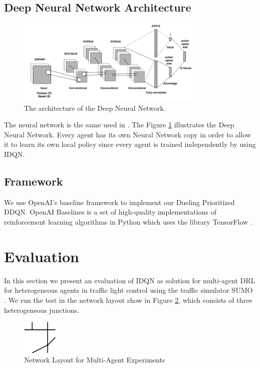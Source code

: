 \documentclass{llncs}
\begin{document}
\subsection{Deep Neural Network Architecture}\label{DNNArch}

\begin{figure}[!htbp]
\begin{center}
  \includegraphics[width=0.8\textwidth]{images/CNN.png}
  \caption{The architecture of the Deep Neural Network.}
  \label{fig:CNN}
\end{center}
\end{figure}

The neural network is the same used in \cite{Wang2016}. The Figure \ref{fig:CNN} illustrates the Deep Neural Network. Every agent has its own Neural Network copy in order to allow it to learn its own local policy since every agent is trained independently by using IDQN.

\subsection{Framework}

We use OpenAI's baseline framework \cite{baselines} to implement our Dueling Prioritized DDQN. OpenAI Baselines is a set of high-quality implementations of reinforcement learning algorithms in Python which uses the library TensorFlow \cite{Abadi2016}. 

\section{Evaluation}

In this section we present an evaluation of IDQN as solution for multi-agent DRL for heterogeneous agents in traffic light control using the traffic simulator SUMO \cite{SUMO2012}. We run the test in the network layout show in Figure \ref{fig:simSetup}, which consists of three heterogeneous junctions. 

\begin{figure}
\begin{center}
  \includegraphics[width=0.15\textwidth]{images/MARL_env.png}
  \caption{Network Layout for Multi-Agent Experiments}
  \label{fig:simSetup}
\end{center}
\end{figure}
\end{document}
